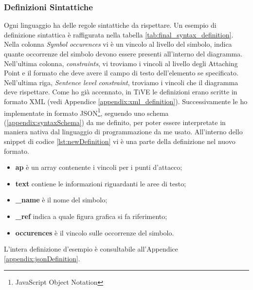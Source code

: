             \subsubsection{Definizioni Sintattiche}
                Ogni linguaggio ha delle regole sintattiche da rispettare. Un esempio di definizione sintattica è raffigurata nella tabella \ref{tab:final_syntax_definition}. Nella colonna \textit{Symbol occurences} vi è un vincolo al livello del simbolo, indica quante occorrenze del simbolo devono essere presenti all'interno del diagramma. Nell'ultima colonna, \textit{constraints}, vi troviamo i vincoli al livello degli Attaching Point e il formato che deve avere il campo di testo dell'elemento se specificato. Nell'ultima riga, \textit{Sentence level constraint}, troviamo i vincoli che il diagramma deve rispettare.
                \newline
                Come ho già accennato, in TiVE le definizioni erano scritte in formato XML (vedi Appendice \ref{appendix:xml_definition}). Successivamente le ho implementate in formato JSON\footnote{JavaScript Object Notation}, seguendo uno schema (\ref{appendix:syntaxSchema}) da me definito, per poter essere interpretate in maniera nativa dal linguaggio di programmazione da me usato. All'interno dello snippet di codice \ref{lst:newDefinition} vi è una parte della definizione nel nuovo formato. 
                \begin{spacing}{0.5}
                    
                \end{spacing}
                \begin{itemize}
                    \item \textbf{ap} è un array contenente i vincoli per i punti d'attacco;
                    \item \textbf{text} contiene le informazioni riguardanti le aree di testo;
                    \item \textbf{\_name} è il nome del simbolo;
                    \item \textbf{\_ref} indica a quale figura grafica si fa riferimento;
                    \item \textbf{occurences} è il vincolo sulle occorrenze del simbolo.
                \end{itemize}
                L'intera definizione d'esempio è consultabile all'Appendice \ref{appendix:jsonDefinition}.

